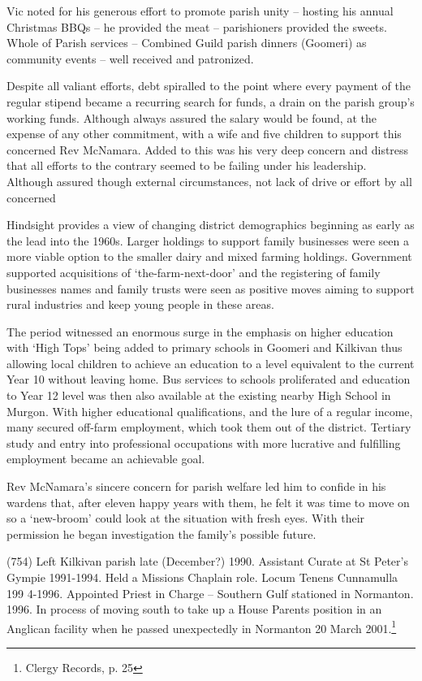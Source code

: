 Vic noted for his generous effort to promote parish unity -- hosting his
annual Christmas BBQs -- he provided the meat -- parishioners provided
the sweets. Whole of Parish services -- Combined Guild parish dinners
(Goomeri) as community events -- well received and patronized.

Despite all valiant efforts, debt spiralled to the point where every
payment of the regular stipend became a recurring search for funds, a
drain on the parish group's working funds. Although always assured the
salary would be found, at the expense of any other commitment, with a
wife and five children to support this concerned Rev McNamara. Added to
this was his very deep concern and distress that all efforts to the
contrary seemed to be failing under his leadership. Although assured
though external circumstances, not lack of drive or effort by all
concerned

Hindsight provides a view of changing district demographics beginning as
early as the lead into the 1960s. Larger holdings to support family
businesses were seen a more viable option to the smaller dairy and mixed
farming holdings. Government supported acquisitions of
`the-farm-next-door' and the registering of family businesses names and
family trusts were seen as positive moves aiming to support rural
industries and keep young people in these areas.

The period witnessed an enormous surge in the emphasis on higher
education with `High Tops' being added to primary schools in Goomeri and
Kilkivan thus allowing local children to achieve an education to a level
equivalent to the current Year 10 without leaving home. Bus services to
schools proliferated and education to Year 12 level was then also
available at the existing nearby High School in Murgon. With higher
educational qualifications, and the lure of a regular income, many
secured off-farm employment, which took them out of the district.
Tertiary study and entry into professional occupations with more
lucrative and fulfilling employment became an achievable goal.

Rev McNamara's sincere concern for parish welfare led him to confide in
his wardens that, after eleven happy years with them, he felt it was
time to move on so a `new-broom' could look at the situation with fresh
eyes. With their permission he began investigation the family's possible
future.

(754) Left Kilkivan parish late (December?) 1990. Assistant Curate at St
Peter's Gympie 1991-1994. Held a Missions Chaplain role. Locum Tenens
Cunnamulla 199 4-1996. Appointed Priest in Charge -- Southern Gulf
stationed in Normanton. 1996. In process of moving south to take up a
House Parents position in an Anglican facility when he passed
unexpectedly in Normanton 20 March 2001.\footnote{Clergy Records, p. 25}

